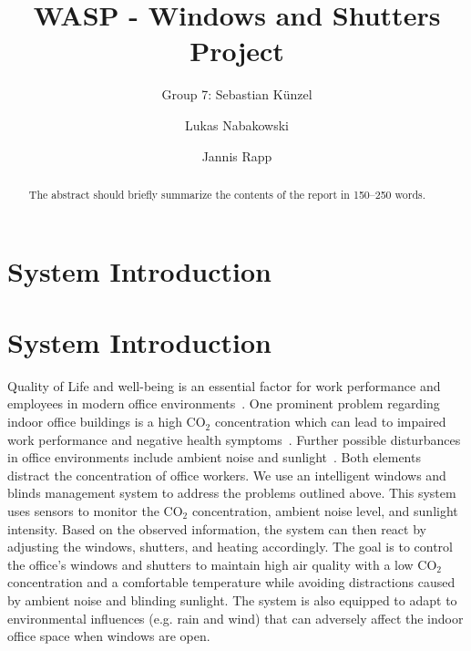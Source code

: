\documentclass[runningheads]{llncs}
\begin{document}
%
\title{WASP - Windows and Shutters Project}

\author{Group 7: Sebastian Künzel \and
Lukas Nabakowski \and
Jannis Rapp}

%
\maketitle              %
%
\begin{abstract}
The abstract should briefly summarize the contents of the report in
150--250 words. 

\end{abstract}
%
%
%
\section{System Introduction}

\section{System Introduction}

Quality of Life and well-being is an essential factor for work performance and employees in modern office environments~\cite{employee_wellbeingimportant}. One prominent problem regarding indoor office buildings is a high CO$_2$ concentration which can lead to impaired work performance and negative health symptoms~\cite{indoor_polutionCO2}. Further possible disturbances in office environments include ambient noise and sunlight~\cite{indoor_noiselight}. Both elements distract the concentration of office workers. 
\newline
We use an intelligent windows and blinds management system to address the problems outlined above.
This system uses sensors to monitor the CO$_2$ concentration, ambient noise level, and sunlight intensity.
Based on the observed information, the system can then react by adjusting the windows, shutters, and heating accordingly.
\newline
The goal is to control the office's windows and shutters to maintain high air quality with a low CO$_2$ concentration and a comfortable temperature while avoiding distractions caused by ambient noise and blinding sunlight. The system is also equipped to adapt to environmental influences (e.g. rain and wind) that can adversely affect the indoor office space when windows are open.   
\end{document}
